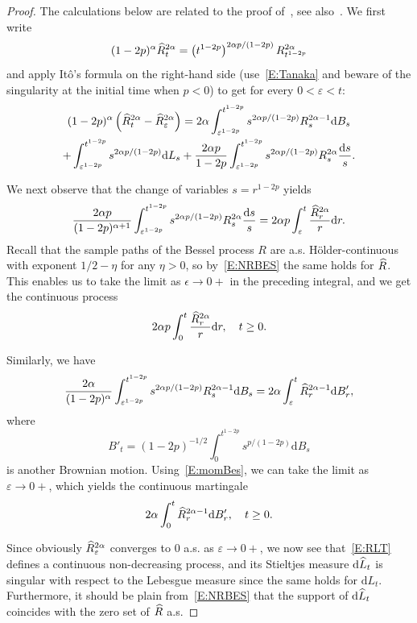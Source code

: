 \documentclass[10pt]{amsart}
\theoremstyle{definition}\newtheorem{defi}[theo]{Definition}\newtheorem{rema}[theo]{Remark}\newtheorem{exam}[theo]{Example}\newtheorem{exem}[theo]{Example}\newtheorem{nota}[theo]{Notation}
\renewcommand{\hat}[1]{\widehat{#1}}
\newcommand{\dd}{\mathrm{d}}
\let\oldhat\hat
\renewcommand*{\hat}[1]{\mathchoice{\widehat{#1}}{\widehat{#1}}{\oldhat{#1}}{\oldhat{#1}}}
\begin{document}
\begin{proof}
The calculations below are related to the proof of~\cite[Proposition~2.1]{HY}, see also~\cite[Exercise~6.11]{CY}. We first write
\[
(1-2p)^{\alpha} \hat R^{2\alpha}_t = \left(t^{1-2p}\right)^{2\alpha p/(1-2p)} R^{2\alpha}_{t^{1-2p}}
\]
and apply Itô's formula on the right-hand side (use~\eqref{E:Tanaka} and beware of the singularity at the initial time when $p<0$) to get for every $0<\varepsilon<t$:
\begin{multline*}
(1-2p)^{\alpha} \left(\hat R^{2\alpha}_t - \hat R^{2\alpha}_{\varepsilon} \right)
=  2\alpha \int_{\varepsilon^{1-2p}}^{t^{1-2p}} s^{2\alpha p/(1-2p)} R^{2\alpha-1}_s \dd B_s\\
+ \int_{\varepsilon^{1-2p}}^{t^{1-2p}} s^{2\alpha p/(1-2p)} \dd {L}_s + \frac {2\alpha p}{1-2p} \int_{\varepsilon^{1-2p}}^{t^{1-2p}} s^{2\alpha p/(1-2p)} R^{2\alpha}_s \frac{\dd s}{s}.
\end{multline*}


We next observe that the change of variables $s=r^{1-2p}$ yields
\[
\frac {2\alpha p}{(1-2p)^{\alpha+1}} \int_{\varepsilon^{1-2p}}^{t^{1-2p}} s^{2\alpha p/(1-2p)} R^{2\alpha}_s \frac{\dd s}{s}= 2\alpha p \int_{\varepsilon}^{t} \frac{\hat R^{2\alpha}_r}{r} \dd r.
\]
Recall that the sample paths of the Bessel process $R$ are a.s. H\"older-continuous with exponent $1/2-\eta$ for any $\eta>0$, so by~\eqref{E:NRBES} the same holds for $\hat R$. This enables us to take the limit as $\epsilon\to 0+$ in the preceding integral, and we get the continuous process
\[
2\alpha p \int_{0}^{t} \frac{\hat R^{2\alpha}_r}{r} \dd r, \quad t\geq 0.
\]

Similarly, we have
\[
\frac {2\alpha }{(1-2p)^{\alpha}} \int_{\varepsilon^{1-2p}}^{t^{1-2p}} s^{2\alpha p/(1-2p)} R^{2\alpha-1}_s \dd B_s= 2\alpha \int_{\varepsilon}^{t} \hat R^{2\alpha-1}_r \dd B'_r,
\]
where
\begin{equation}\label{E:B'}
B'_t= (1-2p)^{-1/2} \int_0^{t^{1-2p}} s^{p/(1-2p)} \dd B_{s}
\end{equation}
is another Brownian motion. Using~\eqref{E:momBes}, we can take the limit as $\varepsilon\to 0+$, which yields the continuous martingale
\[
2\alpha \int_{0}^{t} \hat R^{2\alpha-1}_r \dd B'_r,\quad t\geq 0.
\]

Since obviously $ \hat R^{2\alpha}_{\varepsilon}$ converges to $0$ a.s. as $\varepsilon \to 0+$, we now see that~\eqref{E:RLT} defines a continuous non-decreasing process, and its Stieltjes measure $\dd \hat{L}_t$ is singular with respect to the Lebesgue measure since the same holds for $\dd {L}_t$. Furthermore, it should be plain from~\eqref{E:NRBES} that the support of $\dd \hat{L}_t$ coincides with the zero set of $\hat R$ a.s.
\end{proof}
\end{document}
